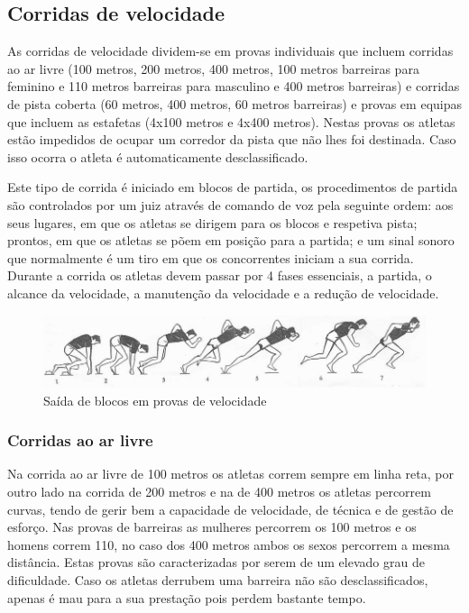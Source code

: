 \documentclass{report}
\begin{document}
        \subsection{Corridas de velocidade}
        As corridas de velocidade dividem-se em provas individuais que incluem corridas ao ar livre (100 metros, 200 metros, 400 metros, 100 metros barreiras para feminino e 110 metros barreiras para masculino e 400 metros barreiras) e corridas de pista coberta (60 metros, 400 metros, 60 metros barreiras) e provas em equipas que incluem as estafetas (4x100 metros e 4x400 metros). Nestas provas os atletas estão impedidos de ocupar um corredor da pista que não lhes foi destinada. Caso isso ocorra o atleta é automaticamente desclassificado. \par
        Este tipo de corrida é iniciado em blocos de partida, os procedimentos de partida são controlados por um juiz através de comando de voz pela seguinte ordem: aos seus lugares, em que os atletas se dirigem para os blocos e respetiva pista; prontos, em que os atletas se põem em posição para a partida; e um sinal sonoro que normalmente é um tiro em que os concorrentes iniciam a sua corrida.
        Durante a corrida os atletas devem passar por 4 fases essenciais, a partida, o alcance da velocidade, a manutenção da velocidade e a redução de velocidade.
        
         \FloatBarrier
            \begin{figure}[h]
            \center
            \includegraphics[scale=.3,angle=0]{velocidade.png}
            \caption{Saída de blocos em provas de velocidade}
            \label{fig:blocos.2}
            \end{figure}
          \FloatBarrier
    
            \subsubsection{Corridas ao ar livre}
            Na corrida ao ar livre de 100 metros os atletas correm sempre em linha reta, por outro lado na corrida de 200 metros e na de 400 metros os atletas percorrem curvas, tendo de gerir bem a capacidade de velocidade, de técnica e de gestão de esforço. Nas provas de barreiras as mulheres percorrem os 100 metros e os homens correm 110, no caso dos 400 metros ambos os sexos percorrem a mesma distância. Estas provas são caracterizadas por serem de um elevado grau de dificuldade. Caso os atletas derrubem uma barreira não são desclassificados, apenas é mau para a sua prestação pois perdem bastante tempo.
\end{document}
